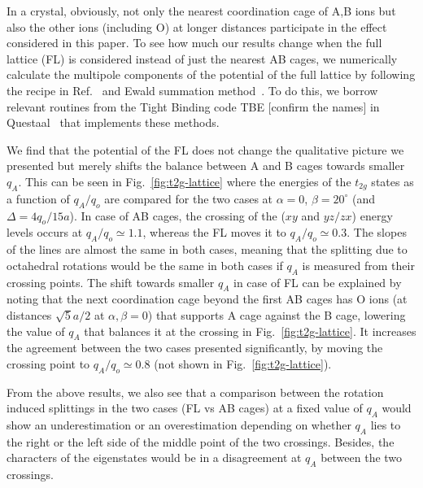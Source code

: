 \documentclass[a4paper,prb,twocolumn]{revtex4-1}  %
\newcommand{\com}[1]{}
\newcommand{\az}[1]{{\color{magenta}{#1}}} %
\begin{document}
In a crystal, obviously, not only the nearest coordination cage of A,B ions but also
 the other ions (including O) at longer distances
  participate in the effect considered in this paper.
To see how much our results change when 
 the full lattice (FL) is considered instead of just the nearest AB cages,
we numerically calculate the multipole components of the potential
 of the full lattice by following the recipe in Ref.~\cite{PaxtonNotes, book?}
and Ewald summation method~\cite{Ewald}.
To do this, 
we borrow relevant routines from the Tight Binding code TBE [confirm the names] in Questaal~\cite{https://www.questaal.org/} that implements these methods.


\com{First,
FL does not preserve the cubic symmetry of the potential and the degeneracy of the t2g manifold 
is slightly lifted at zero rotations, i.e., for a cubic structure.
However, it is insignificant and we will not discuss it further.
What's more important is that the
potential of the full lattice does not change the qualitative picture we resented
but merely shifts the balance between A and B cages towards smaller $q_A$.
}

We find that the
potential of the FL does not change the qualitative picture we presented
but merely shifts the balance between A and B cages towards smaller $q_A$.
This can be seen in Fig.~\ref{fig:t2g-lattice}
where the energies of the $t_{2g}$ states as a function of $q_A/q_o$
are compared for the two cases
at $\alpha=0$, $\beta=20^\circ$ (and $\Delta=4q_o/15a$).
In case of AB cages, the crossing of the 
($xy$ and $yz/zx$)
energy levels occurs 
at $q_A/q_o\simeq1.1$,
whereas the FL moves it to $q_A/q_o\simeq0.3$.
The slopes of the lines are almost the same in both cases,
meaning that the splitting due to octahedral rotations 
would be the same in both cases if $q_A$ is measured 
from their crossing points.
The shift towards smaller $q_A$ in case of FL
can be explained by noting that
the next coordination cage beyond the first AB cages
has O ions
(at distances $\sqrt{5}a/2$ at $\alpha,\beta=0$) %
that supports A cage
against the B cage, lowering the value of $q_A$ that balances it
at the crossing in Fig.~\ref{fig:t2g-lattice}.
It increases the agreement between the two cases presented significantly,
by moving the crossing point 
to $q_A/q_o\simeq0.8$ (not shown in Fig.~\ref{fig:t2g-lattice}).

From the above results, we also see that
a comparison between the rotation induced splittings
 in the two
cases (FL vs AB cages)
at a fixed value of $q_A$
would show an underestimation or an overestimation 
depending on whether $q_A$ lies to the right or the left side of the 
middle point of the two crossings.
Besides, the characters of the eigenstates
would be in a disagreement at $q_A$
between the two crossings.
\end{document}
